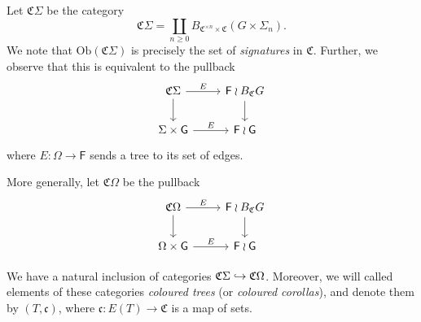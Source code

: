\documentclass[psamsfonts,onesided,10pt
,draft
]{amsart}%
\begin{document}
\begin{definition}
      Let $\mathfrak C \Sigma$ be the category
      \begin{equation}
            \mathfrak C \Sigma = \coprod\limits_{n\geq 0} B_{\mathfrak C^{\times n} \times \mathfrak C}(G \times \Sigma_n).
      \end{equation}
      We note that $\mathrm{Ob}(\mathfrak C \Sigma)$ is precisely the set of \textit{signatures} in $\mathfrak C$.
      Further, we observe that this is equivalent to the pullback
      \begin{equation}
            \label{CSIGMA_EQ}
            \begin{tikzcd}
                  \mathfrak C \Sigma \arrow[d] \arrow[r, "E"]
                  &
                  \mathsf F \wr B_{\mathfrak C}G \arrow[d]
                  \\
                  \Sigma \times \mathsf G \arrow[r, "E"]
                  &
                  \mathsf F \wr \mathsf G
            \end{tikzcd}
      \end{equation}
      where $E: \Omega \to \mathsf F$ sends a tree to its set of edges.
      
      More generally, let $\mathfrak C \Omega$ be the pullback
      \begin{equation}
            \label{COMEGA_EQ}
            \begin{tikzcd}
                  \mathfrak C \Omega \arrow[d] \arrow[r, "E"]
                  &
                  \mathsf F \wr B_{\mathfrak C}G \arrow[d]
                  \\
                  \Omega \times \mathsf G \arrow[r, "E"]
                  &
                  \mathsf F \wr \mathsf G
            \end{tikzcd}
      \end{equation}

      We have a natural inclusion of categories $\mathfrak C \Sigma \hookrightarrow \mathfrak C \Omega$.
      Moreover, we will called elements of these categories
      \textit{coloured trees} (or \textit{coloured corollas}),
      and denote them by $(T,\mathfrak c)$, where $\mathfrak c: E(T) \to \mathfrak C$ is a map of sets.
\end{definition}
\end{document}
